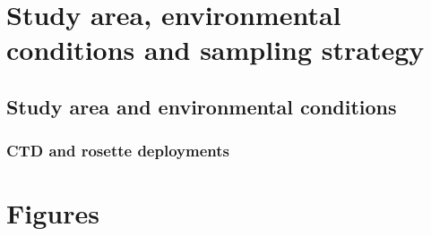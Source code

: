 \documentclass[essd, manuscript]{copernicus}
\begin{document}




\received{}
\pubdiscuss{} %
\revised{}
\accepted{}
\published{}



\maketitle

\begin{abstract}
    
\end{abstract}


\introduction  %

\section{Study area, environmental conditions and sampling strategy}

\subsection{Study area and environmental conditions}

\subsubsection{CTD and rosette deployments}

\newpage

\section{Figures}
\end{document}
